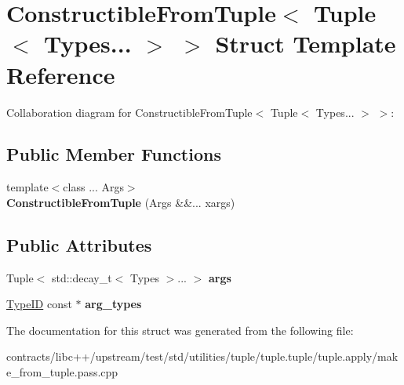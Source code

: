 \hypertarget{struct_constructible_from_tuple_3_01_tuple_3_01_types_8_8_8_01_4_01_4}{}\section{Constructible\+From\+Tuple$<$ Tuple$<$ Types... $>$ $>$ Struct Template Reference}
\label{struct_constructible_from_tuple_3_01_tuple_3_01_types_8_8_8_01_4_01_4}


Collaboration diagram for Constructible\+From\+Tuple$<$ Tuple$<$ Types... $>$ $>$\+:
\subsection*{Public Member Functions}
\begin{DoxyCompactItemize}
\item 
\mbox{\label{struct_constructible_from_tuple_3_01_tuple_3_01_types_8_8_8_01_4_01_4_ae24ad6e6777d5f9b72470e17ab65da77}} 
{\footnotesize template$<$class ... Args$>$ }\\{\bfseries Constructible\+From\+Tuple} (Args \&\&... xargs)
\end{DoxyCompactItemize}
\subsection*{Public Attributes}
\begin{DoxyCompactItemize}
\item 
\mbox{\label{struct_constructible_from_tuple_3_01_tuple_3_01_types_8_8_8_01_4_01_4_ac64e2f50a362687e9f083d1da9aa7569}} 
Tuple$<$ std\+::decay\+\_\+t$<$ Types $>$... $>$ {\bfseries args}
\item 
\mbox{\label{struct_constructible_from_tuple_3_01_tuple_3_01_types_8_8_8_01_4_01_4_ac39fcfdeacab141c1ec0740150a07d2b}} 
\mbox{\hyperlink{struct_type_i_d}{Type\+ID}} const  $\ast$ {\bfseries arg\+\_\+types}
\end{DoxyCompactItemize}


The documentation for this struct was generated from the following file\+:\begin{DoxyCompactItemize}
\item 
contracts/libc++/upstream/test/std/utilities/tuple/tuple.\+tuple/tuple.\+apply/make\+\_\+from\+\_\+tuple.\+pass.\+cpp\end{DoxyCompactItemize}
